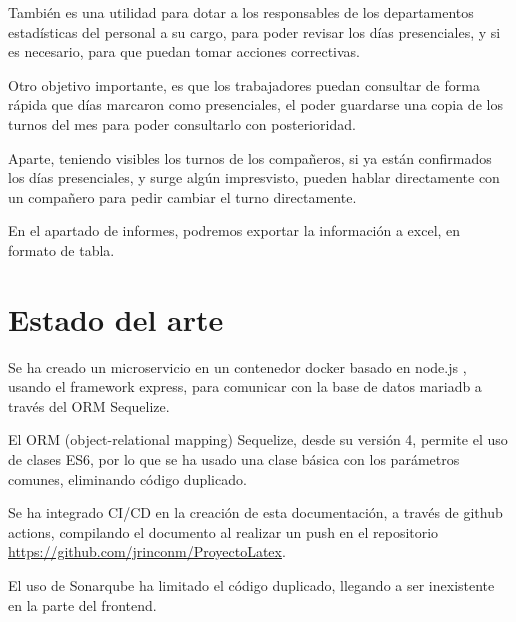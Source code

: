 \documentclass[11pt,spanish,listoffigures,listoftables]{tfgetsinf}
\begin{document}
También es una utilidad para dotar a los responsables de los departamentos estadísticas del personal a su cargo, para poder revisar los días presenciales, y si es necesario, para que puedan tomar acciones correctivas.

Otro objetivo importante, es que los trabajadores puedan consultar de forma rápida que días marcaron como presenciales, el poder guardarse una copia de los turnos del mes para poder consultarlo con posterioridad.

Aparte, teniendo visibles los turnos de los compañeros, si ya están confirmados los días presenciales, y surge algún impresvisto, pueden hablar directamente con un compañero para pedir cambiar el turno directamente.

En el apartado de informes, podremos exportar la información a excel, en formato de tabla.





\chapter{Estado del arte}

Se ha creado un microservicio en un contenedor docker basado en node.js , usando el framework express, para comunicar con la base de datos mariadb a través del ORM Sequelize. 

El ORM (object-relational mapping) Sequelize, desde su versión 4, permite el uso de clases ES6, por lo que se ha usado una clase básica con los parámetros comunes, eliminando código duplicado.

Se ha integrado CI/CD en la creación de esta documentación, a través de github actions, compilando el documento al realizar un push en el repositorio \url{https://github.com/jrinconm/ProyectoLatex}.

El uso de Sonarqube ha limitado el código duplicado, llegando a ser inexistente en la parte del frontend.
\end{document}
